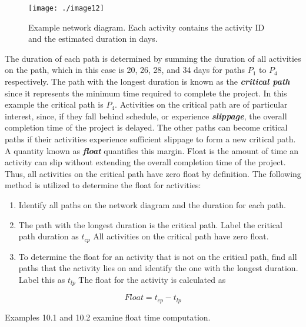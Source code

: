\begin{figure}
\texttt{[image: ./image12]}
\caption{Example network diagram. Each activity contains the
activity ID and the estimated duration in days.}
\label{figure:exampleNetworkDiagram}
\end{figure}

The duration of each path is determined by summing the duration of all
activities on the path, which in this case is 20, 26, 28, and 34 days
for paths $P_1$ to $P_4$
respectively. The path with the longest duration is known as the
\emph{\textbf{critical path}} since it represents the minimum time
required to complete the project. In this example the critical path is
$P_4$.
Activities on the critical path are of particular interest, since, if
they fall behind schedule, or experience \emph{\textbf{slippage}}, the
overall completion time of the project is delayed. The other paths can
become critical paths if their activities experience sufficient slippage
to form a new critical path. A quantity known as \emph{\textbf{float}}
quantifies this margin. Float is the amount of time an activity can slip
without extending the overall completion time of the project. Thus, all
activities on the critical path have zero float by definition. The
following method is utilized to determine the float for activities:

\begin{enumerate}
\def\labelenumi{\arabic{enumi}.}
\item
  Identify all paths on the network diagram and the duration for each
  path.
\item
  The path with the longest duration is the critical path. Label the
  critical path duration as $t_{cp}$
  All activities on the critical path have zero float.
\item
  To determine the float for an activity that is not on the critical
  path, find all paths that the activity lies on and identify the one
  with the longest duration. Label this as $t_{lp}$ The float for the
  activity is calculated as
\end{enumerate}


\begin{equation}
\label{equ:floatTime}
Float = t_{cp} - t_{lp}
\end{equation}



Examples 10.1 and 10.2 examine float time computation.


